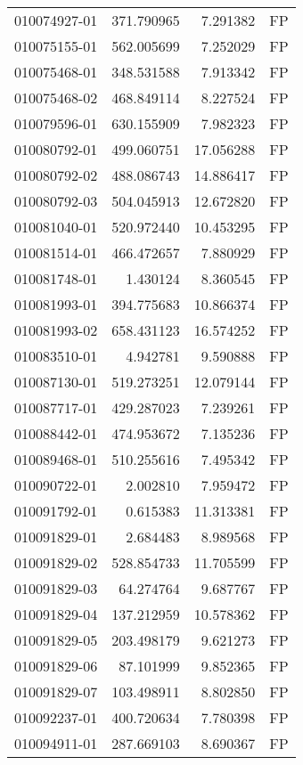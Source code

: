 \begin{tabular}{lrrl}
010074927-01 &  371.790965 &     7.291382 &   FP \\
010075155-01 &  562.005699 &     7.252029 &   FP \\
010075468-01 &  348.531588 &     7.913342 &   FP \\
010075468-02 &  468.849114 &     8.227524 &   FP \\
010079596-01 &  630.155909 &     7.982323 &   FP \\
010080792-01 &  499.060751 &    17.056288 &   FP \\
010080792-02 &  488.086743 &    14.886417 &   FP \\
010080792-03 &  504.045913 &    12.672820 &   FP \\
010081040-01 &  520.972440 &    10.453295 &   FP \\
010081514-01 &  466.472657 &     7.880929 &   FP \\
010081748-01 &    1.430124 &     8.360545 &   FP \\
010081993-01 &  394.775683 &    10.866374 &   FP \\
010081993-02 &  658.431123 &    16.574252 &   FP \\
010083510-01 &    4.942781 &     9.590888 &   FP \\
010087130-01 &  519.273251 &    12.079144 &   FP \\
010087717-01 &  429.287023 &     7.239261 &   FP \\
010088442-01 &  474.953672 &     7.135236 &   FP \\
010089468-01 &  510.255616 &     7.495342 &   FP \\
010090722-01 &    2.002810 &     7.959472 &   FP \\
010091792-01 &    0.615383 &    11.313381 &   FP \\
010091829-01 &    2.684483 &     8.989568 &   FP \\
010091829-02 &  528.854733 &    11.705599 &   FP \\
010091829-03 &   64.274764 &     9.687767 &   FP \\
010091829-04 &  137.212959 &    10.578362 &   FP \\
010091829-05 &  203.498179 &     9.621273 &   FP \\
010091829-06 &   87.101999 &     9.852365 &   FP \\
010091829-07 &  103.498911 &     8.802850 &   FP \\
010092237-01 &  400.720634 &     7.780398 &   FP \\
010094911-01 &  287.669103 &     8.690367 &   FP \\

\end{tabular}
